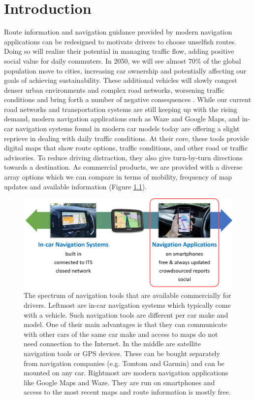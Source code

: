 \chapter{Introduction}
\label{introduction}
Route information and navigation guidance provided by modern navigation applications can be redesigned to motivate drivers to choose unselfish routes. Doing so will realize their potential in managing traffic flow, adding positive social value for daily commuters. In 2050, we will see almost 70\% of the global population move to cities, increasing car ownership and potentially affecting our goals of achieving sustainability. These additional vehicles will slowly congest denser urban environments and complex road networks, worsening traffic conditions and bring forth a number of negative consequences \cite{Mehndiratta2017}. While our current road networks and transportation systems are still keeping up with the rising demand, modern navigation applications such as Waze and Google Maps, and in-car navigation systems found in modern car models today are offering a slight reprieve in dealing with daily traffic conditions. At their core, these tools provide digital maps that show route options, traffic conditions, and other road or traffic advisories. To reduce driving distraction, they also give turn-by-turn directions towards a destination. As commercial products, we are provided with a diverse array options which we can compare in terms of mobility, frequency of map updates and available information (Figure \ref{fig:navi-tools-spectrum}). 

\begin{figure}[t]
  \centering
  \includegraphics[scale=0.45]{figures/navi-tools-spectrum.png}
  \caption{The spectrum of navigation tools that are available commercially for drivers. Leftmost are in-car navigation systems which typically come with a vehicle. Such navigation tools are different per car make and model. One of their main advantages is that they can communicate with other cars of the same car make and access to maps do not need connection to the Internet. In the middle are satellite navigation tools or GPS devices. These can be bought separately from navigation companies (e.g. Tomtom and Garmin) and can be mounted on any car. Rightmost are modern navigation applications like Google Maps and Waze. They are run on smartphones and access to the most recent maps and route information is mostly free.}
  \label{fig:navi-tools-spectrum}
\end{figure}


